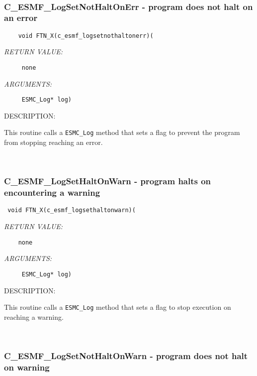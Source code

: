 \mbox{}\hrulefill\ 
 

  \subsubsection [C\_ESMF\_LogSetNotHaltOnErr] {C\_ESMF\_LogSetNotHaltOnErr - program does not halt on an error}


  
\begin{verbatim}    void FTN_X(c_esmf_logsetnothaltonerr)(\end{verbatim}{\em RETURN VALUE:}
\begin{verbatim}     none\end{verbatim}{\em ARGUMENTS:}
\begin{verbatim}     ESMC_Log* log)\end{verbatim}
{\sf DESCRIPTION:\\ }


      This routine calls a {\tt ESMC\_Log} method that sets a flag to 
      prevent the program
      from stopping reaching an error.  
 
\mbox{}\hrulefill\ 
 

  \subsubsection [C\_ESMF\_LogSetHaltOnWarn] {C\_ESMF\_LogSetHaltOnWarn - program halts on encountering a warning}


  
\begin{verbatim} void FTN_X(c_esmf_logsethaltonwarn)(\end{verbatim}{\em RETURN VALUE:}
\begin{verbatim}    none\end{verbatim}{\em ARGUMENTS:}
\begin{verbatim}     ESMC_Log* log)\end{verbatim}
{\sf DESCRIPTION:\\ }


      This routine calls a {\tt ESMC\_Log} method that sets a flag to stop execution on
      reaching a warning. 
 
\mbox{}\hrulefill\ 
 

  \subsubsection [C\_ESMF\_LogSetNotHaltOnWarn] {C\_ESMF\_LogSetNotHaltOnWarn - program does not halt on warning}


